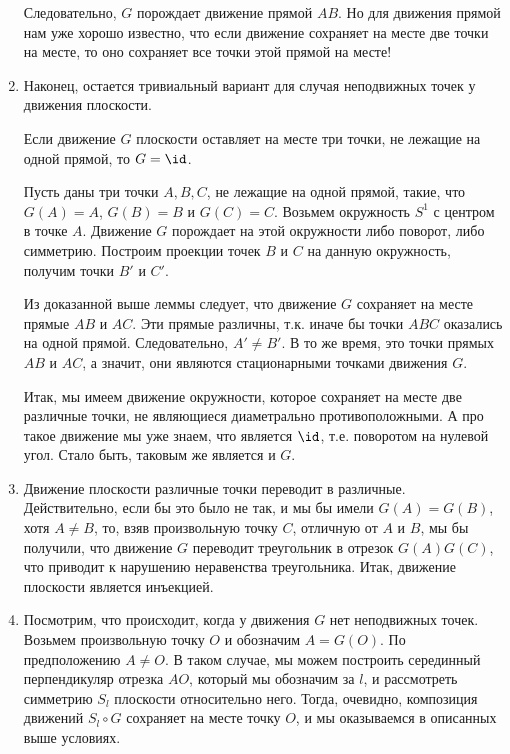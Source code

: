 \begin{enumerate}
Следовательно, $G$ порождает движение прямой $AB$. Но для движения прямой нам уже хорошо известно, что если движение сохраняет на месте две точки на месте, то оно сохраняет все точки этой прямой на месте!
\epf

\item Наконец, остается тривиальный вариант для случая неподвижных точек у движения плоскости.
\begin{thrm}
Если движение $G$ плоскости оставляет на месте три точки, не лежащие на одной прямой, то $G=\id$.
\end{thrm}
\pf
Пусть даны три точки $A,B,C$, не лежащие на одной прямой, такие, что $G(A)=A$, $G(B)=B$ и $G(C)=C$. Возьмем окружность $S^1$ с центром в точке $A$. Движение $G$ порождает на этой окружности либо поворот, либо симметрию. Построим проекции точек $B$ и $C$ на данную окружность, получим точки $B'$ и $C'$.

Из доказанной выше леммы следует, что движение $G$ сохраняет на месте прямые $AB$ и $AC$. Эти прямые различны, т.к. иначе бы точки $ABC$ оказались на одной прямой. Следовательно, $A'\ne B'$. В то же время, это точки прямых $AB$ и $AC$, а значит, они являются стационарными точками движения $G$. 

Итак, мы имеем движение окружности, которое сохраняет на месте две различные точки, не являющиеся диаметрально противоположными. А про такое движение мы уже знаем, что является $\id$, т.е. поворотом на нулевой угол. Стало быть, таковым же является и $G$.
\epf

\item Движение плоскости различные точки переводит в различные. Действительно, если бы это было не так, и мы бы имели $G(A)=G(B)$, хотя $A\ne B$, то, взяв произвольную точку $C$, отличную от $A$ и $B$, мы бы получили, что движение $G$ переводит треугольник в отрезок $G(A)G(C)$, что приводит к нарушению неравенства треугольника. Итак, движение плоскости является инъекцией.



\item Посмотрим, что происходит, когда у движения $G$ нет неподвижных точек. Возьмем произвольную точку $O$ и обозначим $A=G(O)$. По предположению $A\ne O$. В таком случае, мы можем построить серединный перпендикуляр отрезка $AO$, который мы обозначим за $l$, и рассмотреть симметрию $S_l$ плоскости относительно него. Тогда, очевидно, композиция движений $S_l\circ G$ сохраняет на месте точку $O$, и мы оказываемся в описанных выше условиях.


\end{enumerate}
